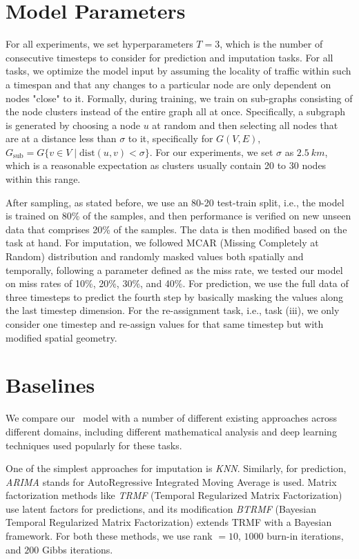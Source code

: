 \section{Model Parameters}

For all experiments, we set hyperparameters $T = 3$, which is the number of consecutive timesteps to consider for prediction and imputation tasks. For all tasks, we optimize the model input by assuming the locality of traffic within such a timespan and that any changes to a particular node are only dependent on nodes "close" to it. Formally, during training, we train on sub-graphs consisting of the node clusters instead of the entire graph all at once. Specifically, a subgraph is generated by choosing a node $u$ at random and then selecting all nodes that are at a distance less than $\sigma$ to it, specifically for $G(V, E)$, $G_{\text{sub}} = G\{v \in V \; | \; \text{dist}(u, v) < \sigma\}$. For our experiments, we set $\sigma$ as $2.5\ km$, which is a reasonable expectation as clusters usually contain 20 to 30 nodes within this range.

After sampling, as stated before, we use an 80-20 test-train split, i.e., the model is trained on 80\% of the samples, and then performance is verified on new unseen data that comprises 20\% of the samples. The data is then modified based on the task at hand. For imputation, we followed MCAR (Missing Completely at Random) distribution and randomly masked values both spatially and temporally, following a parameter defined as the miss rate, we tested our model on miss rates of 10\%, 20\%, 30\%, and 40\%. For prediction, we use the full data of three timesteps to predict the fourth step by basically masking the values along the last timestep dimension. For the re-assignment task, i.e., task (iii), we only consider one timestep and re-assign values for that same timestep but with modified spatial geometry.

\section{Baselines}

We compare our \modelname\ model with a number of different existing approaches across different domains, including different mathematical analysis and deep learning techniques used popularly for these tasks.

One of the simplest approaches for imputation is \textit{KNN}. Similarly, for prediction, \textit{ARIMA}\cite{arima} stands for AutoRegressive Integrated Moving Average is used. Matrix factorization methods like \textit{TRMF}\cite{trmf} (Temporal Regularized Matrix Factorization) use latent factors for predictions, and its modification \textit{BTRMF}\cite{btrmf} (Bayesian Temporal Regularized Matrix Factorization) extends TRMF with a Bayesian framework. For both these methods, we use rank $= 10$, $1000$ burn-in iterations, and $200$ Gibbs iterations.

